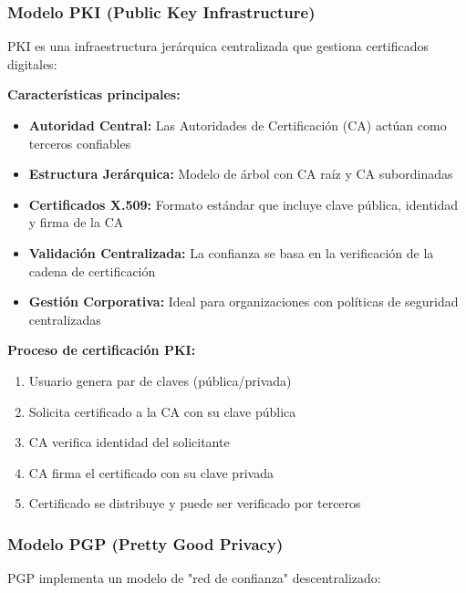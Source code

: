 {%

\subsubsection{Modelo PKI (Public Key Infrastructure)}

PKI es una infraestructura jerárquica centralizada que gestiona certificados digitales:

\textbf{Características principales:}
\begin{itemize}
    \item \textbf{Autoridad Central:} Las Autoridades de Certificación (CA) actúan como terceros confiables
    \item \textbf{Estructura Jerárquica:} Modelo de árbol con CA raíz y CA subordinadas
    \item \textbf{Certificados X.509:} Formato estándar que incluye clave pública, identidad y firma de la CA
    \item \textbf{Validación Centralizada:} La confianza se basa en la verificación de la cadena de certificación
    \item \textbf{Gestión Corporativa:} Ideal para organizaciones con políticas de seguridad centralizadas
\end{itemize}

\textbf{Proceso de certificación PKI:}
\begin{enumerate}
    \item Usuario genera par de claves (pública/privada)
    \item Solicita certificado a la CA con su clave pública
    \item CA verifica identidad del solicitante
    \item CA firma el certificado con su clave privada
    \item Certificado se distribuye y puede ser verificado por terceros
\end{enumerate}

\subsubsection{Modelo PGP (Pretty Good Privacy)}

PGP implementa un modelo de "red de confianza" descentralizado:

}
